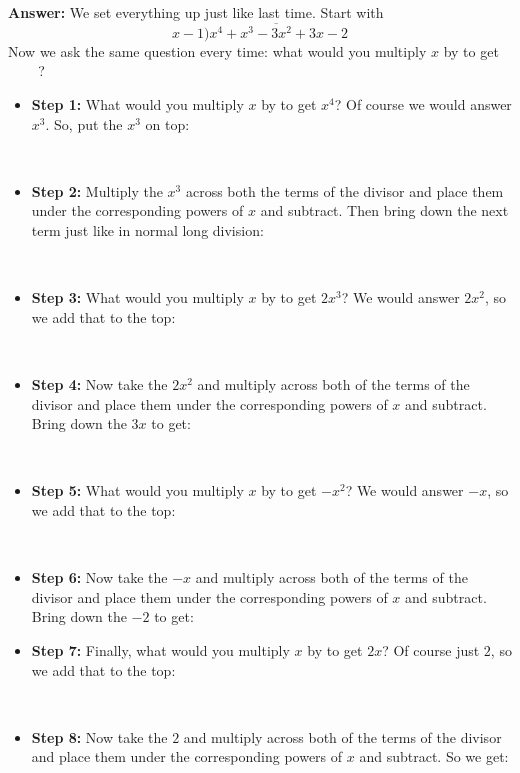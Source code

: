 \documentclass[letterpaper,11pt]{amsart}
\theoremstyle{plain}
\theoremstyle{definition}
\theoremstyle{remark}
\newcommand{\<}{\langle}
\renewcommand{\>}{\rangle}
\begin{document}
\textbf{Answer:}  We set everything up just like last time.  Start with $$x-1 \overline{)x^4+x^3-3x^2+3x-2}$$  Now we ask the same question every time: what would you multiply $x$ by to get \underline{$\, \qquad $}?   
\newpage
\begin{itemize}
\item \textbf{Step 1:}  What would you multiply $x$ by to get $x^4$?  Of course we would answer $x^3$.  So, put the $x^3$ on top:

\\

\item \textbf{Step 2:}  Multiply the $x^3$ across both the terms of the divisor and place them under the corresponding powers of $x$ and subtract.  Then bring down the next term just like in normal long division:

\\

\item \textbf{Step 3:} What would you multiply $x$ by to get $2x^3$?  We would answer $2x^2$, so we add that to the top:

\\

\item \textbf{Step 4:} Now take the $2x^2$ and multiply across both of the terms of the divisor and place them under the corresponding powers of $x$ and subtract.  Bring down the $3x$ to get:

\\



\item \textbf{Step 5:} What would you multiply $x$ by to get $-x^2$?  We would answer $-x$, so we add that to the top:

\\

\newpage

\item \textbf{Step 6:} Now take the $-x$ and multiply across both of the terms of the divisor and place them under the corresponding powers of $x$ and subtract.  Bring down the $-2$ to get:


\item \textbf{Step 7:} Finally, what would you multiply $x$ by to get $2x$?  Of course just $2$, so we add that to the top:

\\


\item \textbf{Step 8:} Now take the $2$ and multiply across both of the terms of the divisor and place them under the corresponding powers of $x$ and subtract. So we get:

\end{itemize}
\end{document}
